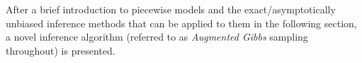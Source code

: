 



After a brief introduction to piecewise models and the
exact/asymptotically unbiased inference methods that can be applied to 
them in the following section, a novel inference 
algorithm (referred to as \emph{Augmented Gibbs} sampling throughout)
is presented. %


